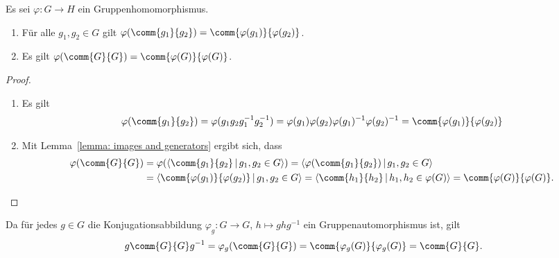 \begin{lemma}
  \label{lemma: images of commutators}
  Es sei $\varphi \colon G \to H$ ein Gruppenhomomorphismus.
  \begin{enumerate}
    \item
      Für alle $g_1, g_2 \in G$ gilt $\varphi(\comm{g_1}{g_2}) = \comm{\varphi(g_1)}{\varphi(g_2)}$.
    \item
      Es gilt $\varphi(\comm{G}{G}) = \comm{\varphi(G)}{\varphi(G)}$.
  \end{enumerate}
\end{lemma}

\begin{proof}
  \begin{enumerate}
    \item
      Es gilt
      \[
          \varphi(\comm{g_1}{g_2})
        = \varphi( g_1 g_2 g_1^{-1} g_2^{-1} )
        = \varphi(g_1) \varphi(g_2) \varphi(g_1)^{-1} \varphi(g_2)^{-1}
        = \comm{ \varphi(g_1) }{ \varphi(g_2) }
      \]
    \item
      Mit Lemma~\ref{lemma: images and generators} ergibt sich, dass
      \begin{align*}
           \varphi( \comm{G}{G} )
        &= \varphi( \generated{ \comm{g_1}{g_2} \suchthat g_1, g_2 \in G } )
         = \generated{ \varphi(\comm{g_1}{g_2}) \suchthat g_1, g_2 \in G }
        \\
        &= \generated{ \comm{\varphi(g_1)}{\varphi(g_2)} \suchthat g_1, g_2 \in G }
         = \generated{ \comm{h_1}{h_2} \suchthat h_1, h_2 \in \varphi(G) }
         = \comm{\varphi(G)}{\varphi(G)}.
      \end{align*}
    \qedhere
  \end{enumerate}
\end{proof}

Da für jedes $g \in G$ die Konjugationsabbildung $\varphi_g \colon G \to G$, $h \mapsto ghg^{-1}$ ein Gruppenautomorphismus ist, gilt
\[
    g \comm{G}{G} g^{-1}
  = \varphi_g( \comm{G}{G} )
  = \comm{\varphi_g(G)}{\varphi_g(G)}
  = \comm{G}{G}.
\]


